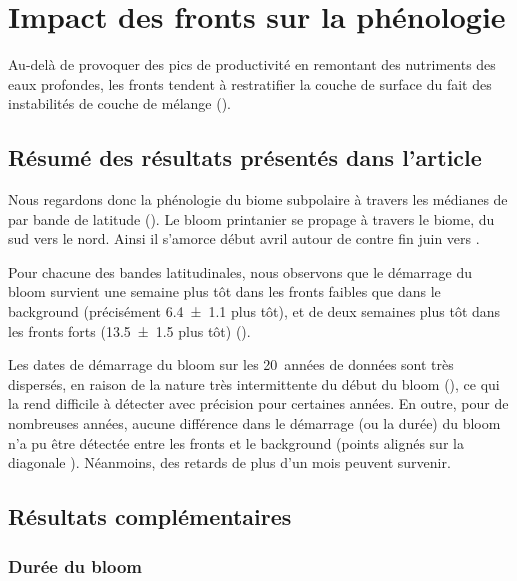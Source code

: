 
\chapter{Impact des fronts sur la phénologie}
\addChpLof
\label{chp:res-phenologie}
\graphicspath{{resources/res_phénologie}}

{
  \hypersetup{hidelinks}
  \minitoc%
  \clearpage
}

Au-delà de provoquer des pics de productivité en remontant des nutriments des eaux profondes, les fronts tendent à restratifier la couche de surface du fait des instabilités de couche de mélange ().

\section{Résumé des résultats présentés dans l'article}
\label{sec:resume-res-phenologie}

Nous regardons donc la phénologie du biome subpolaire à travers les médianes de  par bande de latitude ().
Le bloom printanier se propage à travers le biome, du sud vers le nord.
Ainsi il s'amorce début avril autour de  contre fin juin vers .

Pour chacune des bandes latitudinales, nous observons que le démarrage du bloom survient une semaine plus tôt dans les fronts faibles que dans le background (précisément \qty{6.4 \pm 1.1}{\jours} plus tôt), et de deux semaines plus tôt dans les fronts forts (\qty{13.5 \pm 1.5}{\jours} plus tôt) ().

Les dates de démarrage du bloom sur les 20~années de données sont très dispersés, en raison de la nature très intermittente du début du bloom (\cite{keerthi_2021}), ce qui la rend difficile à détecter avec précision pour certaines années.
En outre, pour de nombreuses années, aucune différence dans le démarrage (ou la durée) du bloom n'a pu être détectée entre les fronts et le background (points alignés sur la diagonale ).
Néanmoins, des retards de plus d'un mois peuvent survenir.

\section{Résultats complémentaires}
\label{sec:complements-phenologie}

\subsection{Durée du bloom}
\label{sec:duree-bloom}

